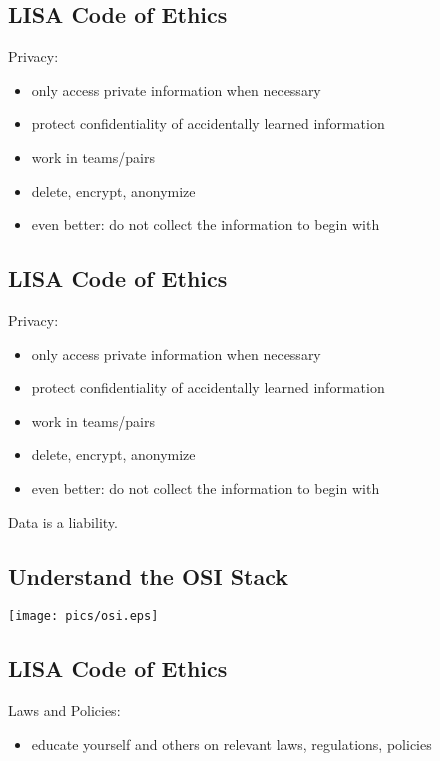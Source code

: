 \documentclass[xga]{xdvislides}
\begin{document}
\subsection{LISA Code of Ethics}
Privacy:
\begin{itemize}
	\item only access private information when necessary
	\item protect confidentiality of accidentally learned information
	\item work in teams/pairs
	\item delete, encrypt, anonymize
	\item even better: do not collect the information to begin with
\end{itemize}

\subsection{LISA Code of Ethics}
Privacy:
\begin{itemize}
	\item only access private information when necessary
	\item protect confidentiality of accidentally learned information
	\item work in teams/pairs
	\item delete, encrypt, anonymize
	\item even better: do not collect the information to begin with
\end{itemize}
\vspace{.5in}
Data is a liability.

\subsection{Understand the OSI Stack}
\vspace*{\fill}
\begin{center}
	\texttt{[image: pics/osi.eps]}
\end{center}
\vspace*{\fill}

\subsection{LISA Code of Ethics}
Laws and Policies:
\begin{itemize}
	\item educate yourself and others on relevant laws, regulations, policies
\end{itemize}
\end{document}

